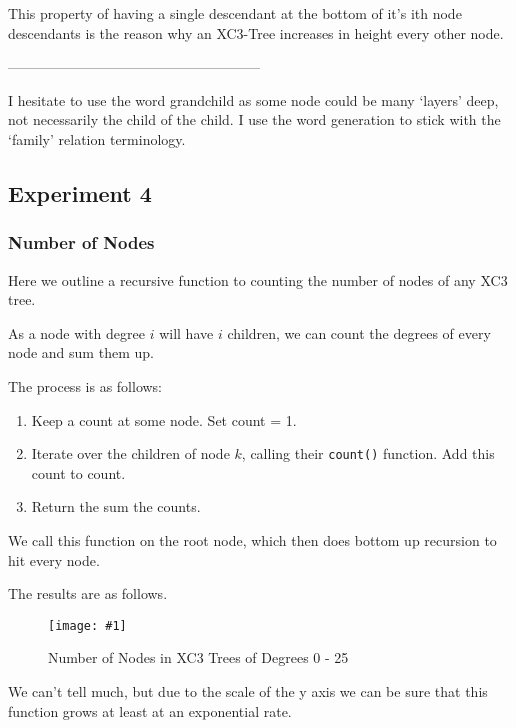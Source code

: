 \documentclass{article}
\newcommand{\figureInsetScaled}[3]
{
    \FloatBarrier{}
    \figureRaw{#1}{#2}{#3}
    \FloatBarrier{}
}
\newcommand{\figureRaw}[3]
{
    \begin{figure}[ht!]
        \centering
        \texttt{[image: \#1]}
        \caption{#2}
    \end{figure}
}
\begin{document}
This property of having a single descendant at the bottom of it's ith node descendants is the reason why an XC3-Tree increases in height every other node.

------------------------------------------------------

{
\small
I hesitate to use the word grandchild as some node could be many `layers' deep, not necessarily the child of the child. I use the word generation to stick with the `family' relation terminology.
}


\newpage
\subsection{Experiment 4}

\subsubsection{Number of Nodes}

Here we outline a recursive function to counting the number of nodes of any XC3 tree.

As a node with degree $i$ will have $i$ children, we can count the degrees of every node and sum them up.

The process is as follows:
\begin{enumerate}
    \item Keep a count at some node. Set count = 1.
    \item Iterate over the children of node $k$, calling their \verb|count()| function. Add this count to count.
    \item Return the sum the counts.
\end{enumerate}

We call this function on the root node, which then does bottom up recursion to hit every node.

The results are as follows.

\figureInsetScaled{images/experiment4/Figure_1.png}{Number of Nodes in XC3 Trees of Degrees 0 - 25}{0.65}

We can't tell much, but due to the scale of the y axis we can be sure that this function grows at least at an exponential rate.
\end{document}
